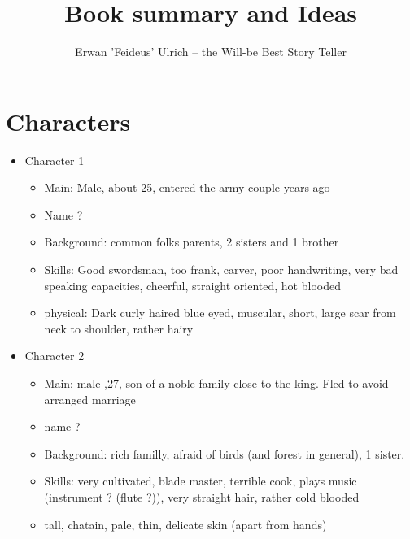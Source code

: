 \documentclass{article}
\begin{document}
\title{Book summary and Ideas}
\author{Erwan 'Feideus' Ulrich -- the Will-be Best Story Teller }
\maketitle

\section{Characters}
\begin{itemize}
\item{Character 1}
	\begin{itemize}
	\item{Main: Male, about 25, entered the army couple years ago}
	\item{Name ?}
	\item{Background: common folks parents, 2 sisters and 1 brother}
	\item{Skills: Good swordsman, too frank, carver, poor handwriting, very bad speaking capacities, cheerful, straight oriented, hot blooded}
	\item{physical: Dark curly haired blue eyed, muscular, short, large scar from neck to shoulder, rather hairy}
	\end{itemize}

\item{Character 2}
	\begin{itemize}
	\item{Main: male ,27, son of a noble family close to the king. Fled to avoid arranged marriage}
	\item{name ?}
	\item{Background: rich familly, afraid of birds (and forest in general), 1 sister.}
	\item{Skills: very cultivated, blade master, terrible cook, plays music (instrument ? (flute ?)), very straight hair, rather cold blooded  }
	\item{tall, chatain, pale, thin, delicate skin (apart from hands)}
	\end{itemize}
\end{itemize}
\end{document}
